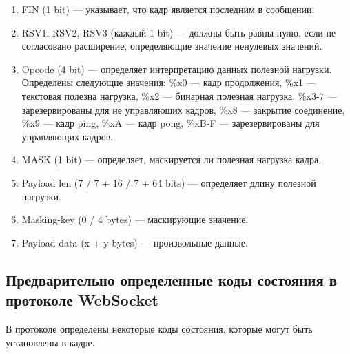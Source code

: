 \begin{enumerate} 
  \item FIN (1 bit) — указывает, что кадр является последним в сообщении.
  
  \item RSV1, RSV2, RSV3 (каждый 1 bit) — должны быть равны нулю, если не согласовано расширение, определяющие значение ненулевых значений.

  \item Opcode (4 bit) — определяет интерпретацию данных полезной нагрузки. Определены следующие значения: \%x0 — кадр продолжения, \%x1 — текстовая полезна нагрузка, \%x2 — бинарная полезная нагрузка, \%x3-7 — зарезервированы для не управляющих кадров, \%x8 — закрытие соединение, \%x9 — кадр ping, \%xA — кадр pong, \%xB-F — зарезервированы для управляющих кадров.

  \item MASK (1 bit) — определяет, маскируется ли полезная нагрузка кадра.

  \item Payload len (7 / 7 + 16 / 7 + 64 bits) — определяет длину полезной нагрузки.

  \item Masking-key (0 / 4 bytes) — маскирующие значение.

  \item Payload data (x + y bytes) — произвольные данные.
\end{enumerate}

\subsection{Предварительно определенные коды состояния в протоколе WebSocket}

В протоколе определены некоторые коды состояния, которые могут быть установлены в кадре.


